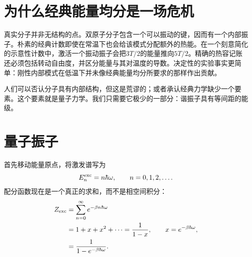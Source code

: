 \begin{classroomqa}
\end{classroomqa}

\begin{classroomqa}
\end{classroomqa}

\section{为什么经典能量均分是一场危机}

真实分子并非无结构的点。双原子分子包含一个可以振动的键，因而有一个内部振子。朴素的经典计数即使在常温下也会给该模式分配额外的热能。在一个刻意简化的示意性计数中，激活一个振动振子会把\(3T/2\)的能量推向\(5T/2\)。精确的热容记账还必须包括转动自由度，并区分能量与其对温度的导数。决定性的实验事实更简单：刚性内部模式在低温下并未像经典能量均分所要求的那样作出贡献。

人们可以否认分子具有内部结构，但这是荒谬的；或者承认经典力学缺少一个要素。这个要素就是量子力学。我们只需要它极少的一部分：谐振子具有等间距的能级。

\section{量子振子}

首先移动能量原点，将激发谱写为
\begin{equation}
 E_n^{\rm exc}=n\hbar\omega,
 \qquad n=0,1,2,\ldots.
 \label{eq:sm7-shifted-spectrum}
\end{equation}
配分函数现在是一个真正的求和，而不是相空间积分：
\begin{align}
 Z_{\rm exc}
 &=\sum_{n=0}^{\infty}e^{-\beta n\hbar\omega} \notag\\
 &=1+x+x^2+\cdots
  =\frac{1}{1-x},
 \qquad x=e^{-\beta\hbar\omega}, \notag\\
 &=\frac{1}{1-e^{-\beta\hbar\omega}}.
 \label{eq:sm7-quantum-z}
\end{align}


